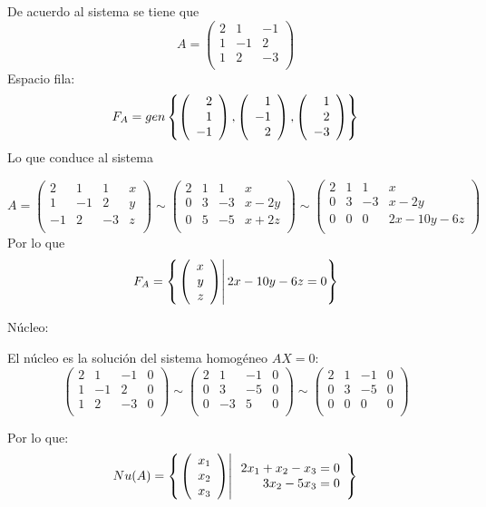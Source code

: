 \begin{enumerate}
\sol

De acuerdo al sistema se tiene que
\[A=
\left(
\begin{array}{rrr}
2&1&-1\\
1&-1&2\\
1&2&-3\\
\end{array}
\right)
\]
Espacio fila:
\[F_A=gen \left\{
\left( \begin{array}{r} 2\\ 1\\ -1 \end{array} \right) , \left( \begin{array}{r} 1\\ -1\\ 2 \end{array} \right) , \left( \begin{array}{r} 1\\ 2\\ -3 \end{array} \right) 
 \right\} \]
Lo que conduce al sistema

\[A=
\left(
\begin{array}{rrr|r}
2&1&1&x\\
1&-1&2&y\\
-1&2&-3&z\\
\end{array}
\right)
\sim
\left(
\begin{array}{rrr|r}
2&1&1&x\\
0&3&-3&x-2y\\
0&5&-5&x+2z\\
\end{array}
\right)
\sim
\left(
\begin{array}{rrr|r}
2&1&1&x\\
0&3&-3&x-2y\\
0&0&0&2x-10y-6z\\
\end{array}
\right)
\]
Por lo que
\[F_A=\left\{ \left. \left( \begin{array}{r} x\\ y\\ z \end{array} \right) \right| 2x-10y-6z=0 \right\}\]

N\'ucleo:

El n\'ucleo es la soluci\'on del sistema homog\'eneo $AX=0$:
\[
\left(
\begin{array}{rrr|r}
2&1&-1&0\\
1&-1&2&0\\
1&2&-3&0\\
\end{array}
\right)
\sim
\left(
\begin{array}{rrr|r}
2&1&-1&0\\
0&3&-5&0\\
0&-3&5&0\\
\end{array}
\right)
\sim
\left(
\begin{array}{rrr|r}
2&1&-1&0\\
0&3&-5&0\\
0&0&0&0\\
\end{array}
\right)
\]

Por lo que:
\[Nu(A)=\left\{ \left. \left( \begin{array}{r} x_1\\ x_2\\ x_3 \end{array} \right) \right| \begin{array}{r}
2x_1+x_2-x_3=0\\
3x_2-5x_3=0
\end{array} \right\}
\]


\end{enumerate}
